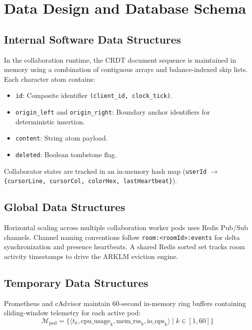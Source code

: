 \documentclass[12pt,a4paper]{report}
\begin{document}
\clearpage
\section{Data Design and Database Schema}

\subsection{Internal Software Data Structures}
In the collaboration runtime, the CRDT document sequence is maintained in memory using a combination of contiguous arrays and balance-indexed skip lists. Each character atom contains:
\begin{itemize}
    \item \texttt{id}: Composite identifier \texttt{(client\_id, clock\_tick)}.
    \item \texttt{origin\_left} and \texttt{origin\_right}: Boundary anchor identifiers for deterministic insertion.
    \item \texttt{content}: String atom payload.
    \item \texttt{deleted}: Boolean tombstone flag.
\end{itemize}
Collaborator states are tracked in an in-memory hash map (\texttt{userId} $\rightarrow$ \texttt{\{cursorLine, cursorCol, colorHex, lastHeartbeat\}}).

\subsection{Global Data Structures}
Horizontal scaling across multiple collaboration worker pods uses Redis Pub/Sub channels. Channel naming conventions follow \texttt{room:<roomId>:events} for delta synchronization and presence heartbeats. A shared Redis sorted set tracks room activity timestamps to drive the ARKLM eviction engine.

\subsection{Temporary Data Structures}
Prometheus and cAdvisor maintain 60-second in-memory ring buffers containing sliding-window telemetry for each active pod:
\begin{equation}
    \mathcal{M}_{\text{pod}} = \{\langle t_k, \text{cpu\_usage}_k, \text{mem\_rss}_k, \text{io\_ops}_k \rangle \mid k \in [1, 60]\}
\end{equation}
\end{document}
